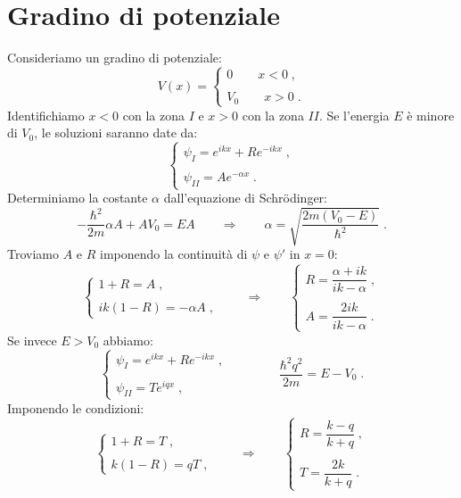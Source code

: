 \documentclass[12pt,a4paper]{report}
\theoremstyle{definition}
\numberwithin{equation}{section}
\newcommand{\Sch}{Schrödinger}
\begin{document}
\section{Gradino di potenziale}
Consideriamo un gradino di potenziale:
\begin{equation}
V(x)=\begin{cases}
0 \qquad x<0\;, \\
\\
V_0 \qquad x>0\;.
\end{cases}
\end{equation}
Identifichiamo $x<0$ con la zona $I$ e $x>0$ con la zona $II$. Se l'energia $E$ è minore di $V_0$, le soluzioni saranno date da:
\begin{equation}
\begin{cases}
\psi_I=e^{ikx}+Re^{-ikx}\;, \\
\\
\psi_{II}=Ae^{-\alpha x}\;.
\end{cases}
\end{equation}
Determiniamo la costante $\alpha$ dall'equazione di \Sch:
$$
-\frac{\hbar^2}{2m}\alpha A+AV_0=EA \qquad \Longrightarrow \qquad \alpha=\sqrt{\frac{2m(V_0-E)}{\hbar^2}}\;.
$$
Troviamo $A$ e $R$ imponendo la continuità di $\psi$ e $\psi'$ in $x=0$:
\begin{equation}
\begin{cases}
1+R=A\;, \\
\\
ik(1-R)=-\alpha A\;,
\end{cases} \qquad \Longrightarrow \qquad
\begin{cases}
R=\dfrac{\alpha+ik}{ik-\alpha}\;, \\
\\
A=\dfrac{2ik}{ik-\alpha}\;.
\end{cases}
\end{equation}
Se invece $E>V_0$ abbiamo:
\begin{equation}
\begin{cases}
\psi_I=e^{ikx}+Re^{-ikx}\;, \\
\\
\psi_{II}=Te^{iqx}\;,
\end{cases} \qquad\qquad \frac{\hbar^2 q^2}{2m}=E-V_0\;.
\end{equation}
Imponendo le condizioni:
\begin{equation}
\begin{cases}
1+R=T\;, \\
\\
k(1-R)=qT\;,
\end{cases}\qquad \Longrightarrow\qquad 
\begin{cases}
R=\dfrac{k-q}{k+q}\;, \\
\\
T=\dfrac{2k}{k+q}\;.
\end{cases}
\end{equation}
\end{document}
